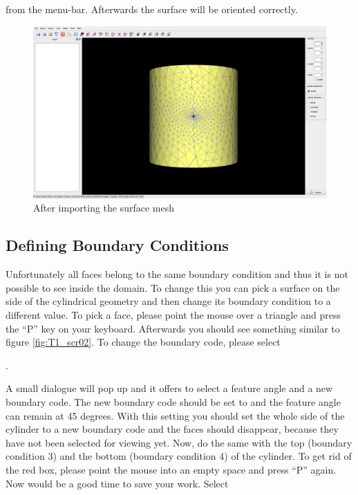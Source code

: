 
from the menu-bar. Afterwards the surface will be oriented correctly.


\begin{figure}
  \begin{centering}
    \includegraphics[width=14cm]{figures/tutorials/T1/scr01}
    \par
  \end{centering}
  \caption{After importing the surface mesh}
  \label{fig:T1_scr01}
\end{figure}

\subsection{Defining Boundary Conditions}
Unfortunately all faces belong to the same boundary condition and thus it is not possible to see inside the domain. To change this you can pick a surface on the side of the cylindrical geometry and then change its boundary condition to a different value. To pick a face, please point the mouse over a triangle and press the {}``P'' key on your keyboard. Afterwards you should see something similar to figure \ref{fig:T1_scr02}. To change the boundary code, please select 

. 

A small dialogue will pop up and it offers to select a feature angle and a new boundary code. The new boundary code should be set to \eqt and the feature angle can remain at 45 degrees. With this setting you should set the whole side of the cylinder to a new boundary code and the faces should disappear, because they have not been selected for viewing yet. Now, do the same with the top (boundary condition 3) and the bottom (boundary condition 4) of the cylinder. To get rid of the red box, please point the mouse into an empty space and press {}``P'' again. Now would be a good time to save your work. Select 

